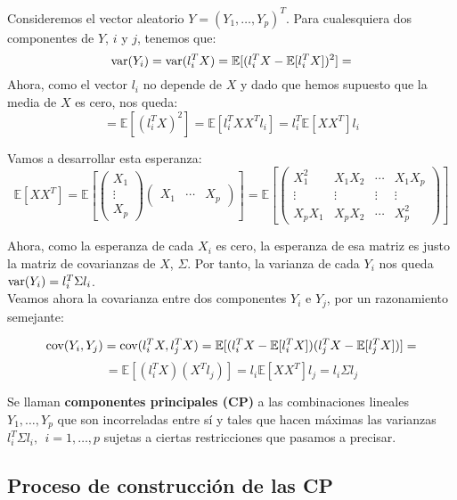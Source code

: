 Consideremos el vector aleatorio $Y=(Y_1, \dots, Y_p)^T$. Para cualesquiera dos componentes de $Y$, $i$ y $j$, tenemos que:
\[	\text{var}{(Y_i)} = \text{var}{(l_i^TX)} = \mathbb{E}[(l_i^TX - \mathbb{E}[l_i^TX])^2] = \]
Ahora, como el vector $l_i$ no depende de $X$ y dado que hemos supuesto que la media de $X$ es cero, nos queda:
\[ = \mathbb{E}[(l_i^TX)^2] = \mathbb{E}[l_i^TXX^Tl_i] = l_i^T \mathbb{E}[XX^T] l_i \] 

Vamos a desarrollar esta esperanza:
\[	\mathbb{E}[XX^T] = \mathbb{E} \left[ \left( \begin{array}{c}
X_1 \\
\vdots \\
X_p \end{array} \right)
\left( \begin{array}{ccc}
X_1 & \cdots & X_p  \end{array} \right) \right] = 
\mathbb{E} \left[ \left( \begin{array}{cccc}
X_1^2 & X_1X_2 & \cdots & X_1X_p \\
\vdots & \vdots & \vdots & \vdots \\
X_pX_1 & X_pX_2 & \cdots & X_p^2 \end{array} \right) \right]
\]

Ahora, como la esperanza de cada $X_i$ es cero, la esperanza de esa matriz es justo la matriz de covarianzas de $X$, $\Sigma$. Por tanto, la varianza de cada $Y_i$ nos queda $\text{var}{(Y_i)} = l_i^T\Sigma l_i$.\\

Veamos ahora la covarianza entre dos componentes $Y_i$ e $Y_j$, por un razonamiento semejante:

\[ \text{cov}{(Y_i, Y_j)} = \text{cov}{(l_i^TX, l_j^TX)} = \mathbb{E}[(l_i^TX - \mathbb{E}[l_i^TX])(l_j^TX - \mathbb{E}[l_j^TX])] = \] 
\[ = \mathbb{E}[(l_i^TX)(X^Tl_j)] = l_i \mathbb{E}[XX^T] l_j = l_i \Sigma l_j	\]

Se llaman \textbf{componentes principales (CP)} a las combinaciones lineales $Y_1, \dots, Y_p$ que son incorreladas entre sí y tales que hacen máximas las varianzas $l_i^T\Sigma l_i,\ \ i=1,\dots,p$ sujetas a ciertas restricciones que pasamos a precisar.

\subsection{Proceso de construcción de las CP}

